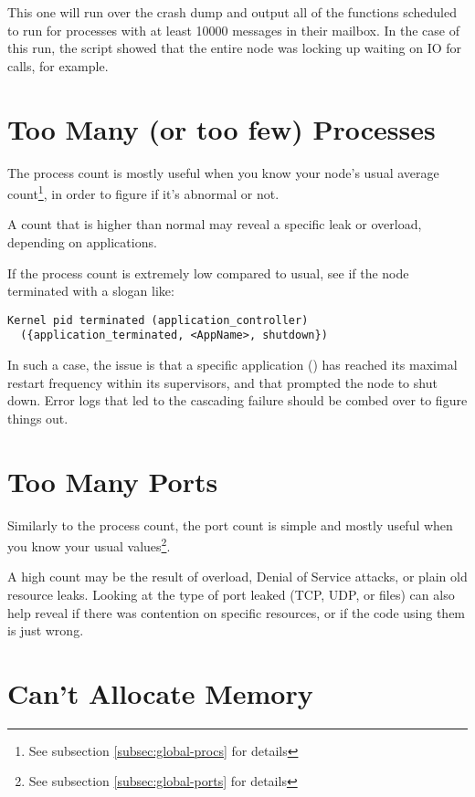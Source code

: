 \documentclass[11pt, oneside]{book}   	%
\begin{document}
This one will run over the crash dump and output all of the functions scheduled to run for processes with at least 10000 messages in their mailbox. In the case of this run, the script showed that the entire node was locking up waiting on IO for  calls, for example.

\section{Too Many (or too few) Processes}

The process count is mostly useful when you know your node's usual average count\footnote{See subsection \ref{subsec:global-procs} for details}, in order to figure if it's abnormal or not.

A count that is higher than normal may reveal a specific leak or overload, depending on applications.

If the process count is extremely low compared to usual, see if the node terminated with a slogan like:

\begin{Verbatim}
Kernel pid terminated (application_controller)
  ({application_terminated, <AppName>, shutdown})
\end{Verbatim}

In such a case, the issue is that a specific application () has reached its maximal restart frequency within its supervisors, and that prompted the node to shut down. Error logs that led to the cascading failure should be combed over to figure things out.

\section{Too Many Ports}

Similarly to the process count, the port count is simple and mostly useful when you know your usual values\footnote{See subsection \ref{subsec:global-ports} for details}.

A high count may be the result of overload, Denial of Service attacks, or plain old resource leaks. Looking at the type of port leaked (TCP, UDP, or files) can also help reveal if there was contention on specific resources, or if the code using them is just wrong.

\section{Can't Allocate Memory}
\end{document}
